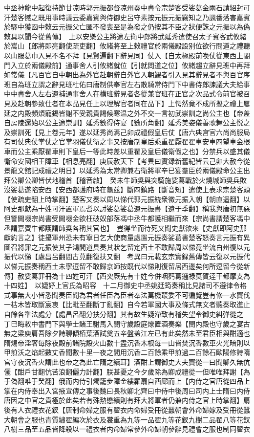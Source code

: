中丞神龍中起復持節甘凉時郭元振都督凉州奏中書令宗楚客受娑葛金兩石請紹封可汗楚客憾之既用事時議云委嘉賓與侍御史呂守素按元振元振竊知之乃諷番落害嘉賓於驛中獲函中敕云元振父亡匿不發喪至是為發之仍按其不臣之狀便誅之元振以為偽敕具以聞今從舊傳】　上以安樂公主將適左衛中郎將武延秀遣使召太子賓客武攸緒於嵩山【郎將即亮翻使疏吏翻】攸緒將至上敕禮官於兩儀殿設别位欲行問道之禮聽以山服葛巾入見不名不拜【見賢遍翻下辭見同】仗入【自太極殿前喚仗從東西上閤門入立於兩儀殿前】通事舍人引攸緒就位【引就問道之位】攸緒趨立辭見班中再拜如常儀【凡百官自中朝出為外官赴朝辭自外官入朝覲者引入見其辭見者不與百官序班自為班立謂之辭見班杜佑曰唐制供奉官左右散騎常侍門下中書侍郎諫議大夫給事中中書舍人左右遺補通事舍人在横班辭見者各從兼官班在正官之次品式令前官被召見及赴朝參致仕者在本品見任上以理解官者同在品下】上愕然竟不成所擬之禮上屢延之内殿頻煩寵錫皆謝不受親貴謁候寒温之外不交一言初武崇訓之尚公主也【帝盖自房陵還始以公主適崇訓】延秀數得侍宴【數所角翻】延秀美姿儀善歌舞公主悦之及崇訓死【見上卷元年】遂以延秀尚焉己卯成禮假皇后仗【唐六典宫官六尚尚服局有司仗典仗掌仗之官掌羽儀仗衛之事又按唐制皇后乘重翟厭翟翟車安車四望車金根車而公主乘厭翟車則下皇后一等此時盖以重翟及皇后儀衛假之也】分禁兵以盛其儀衛命安國相王障車【相息亮翻】庚辰赦天下【考異曰實録新舊紀皆云己卯大赦今從景龍文舘記成禮之明日】以延秀為太常卿兼右衛將軍辛巳宴羣臣於兩儀殿命公主出拜公卿公卿皆伏地稽首【稽音啟】　癸未牛師奨與突騎施娑葛戰於火燒城師奨兵敗沒娑葛遂陷安西【安西都護府時在龜兹】斷四鎮路【斷音短】遣使上表求宗楚客頭【使疏吏翻上時掌翻】楚客又奏以周以悌代郭元振統衆徵元振入朝【朝直遥翻】以阿史那獻為十姓可汗置軍焉耆以討娑葛娑葛遺元振書【遺于季翻】稱我與唐初無惡但讐闕啜宗尚書受闕啜金欲枉破奴部落馮中丞牛都護相繼而來【宗尚書謂楚客馮中丞謂嘉賓牛都護謂師奨各稱其官也】　豈得坐而待死又聞史獻欲來【史獻即阿史那獻約言之】徒擾軍州恐未有寧日乞大使商量處置元振奏娑葛書楚客怒奏言元振有異圖召將罪之元振使其子鴻間道具奏其狀乞留定西土不敢歸周以悌竟坐流白州復以元振代以悌【處昌呂翻間古莧翻復扶又翻　考異曰元載玄宗實録舊傳皆云復以元振代以悌元振奏稱西土未寧逗留不敢歸京師按既代以悌則復留居西邊矣何所逗留今從新傳】赦娑葛罪冊為十四姓可汗【西突厥先有十姓今併咽麫葛邏禄莫賀逹干都摩支為十四姓】　以婕妤上官氏為昭容　十二月御史中丞姚廷筠奏稱比見諸司不遵律令格式事無大小皆悉聞奏臣聞為君者任臣為臣者奉法萬機樷委不可徧覽豈有修一水竇伐一枯木皆取斷宸衷【比毗至翻斷丁亂翻】自今若軍國大事及條式無文者聽奏取進止自餘各準法處分【處昌呂翻分扶分翻】其有故生疑滯致有稽失望令御史糾弹從之　丁巳晦敕中書門下與學士諸王駙馬入閤守歲設庭燎置酒奏樂【閤内殿也守歲之宴古無之梁庾肩吾除夕詩聊傾栢葉酒試奠五辛盤盖江左已有此矣然未至君臣相與酣適也隋焬帝淫奢每除夜殿前諸院設火山數十盡沉香木根每一山皆焚沉香數車火光暗則以甲煎沃之焰起數丈香聞數十里一夜之間用沉香二百餘乘甲煎過二百餘石歐陽修詩隋宫守夜沉香火謂此也帝之為此亡隋之續耳】酒酣上謂御史大夫竇從一曰聞卿久無伉儷【酣戶甘翻伉苦浪翻儷力計翻】朕甚憂之今夕歲除為卿成禮從一但唯唯拜謝【為于偽翻唯于癸翻】俄而内侍引燭籠步障金縷羅扇自西廊而上【内侍之官唐從四品上掌在内侍奉出入宮掖宣傳之事後魏曰長秋卿北齊曰中侍中後周曰司内上士隋曰内侍唐因之中官之貴極於此矣若有殊勲懋績則有拜大將軍者仍兼内侍之官上時掌翻】扇後有人衣禮衣花釵【唐制命婦之服有翟衣内命婦受冊從蠶朝會外命婦嫁及受冊從蠶大朝會之服也青質繡翟編次於衣及裳重為九等一品翟九等花釵九樹二品翟八等花釵八樹三品至五品皆降殺以一禮衣者内命婦常參外命婦朝參辭見禮會之服也制同翟衣